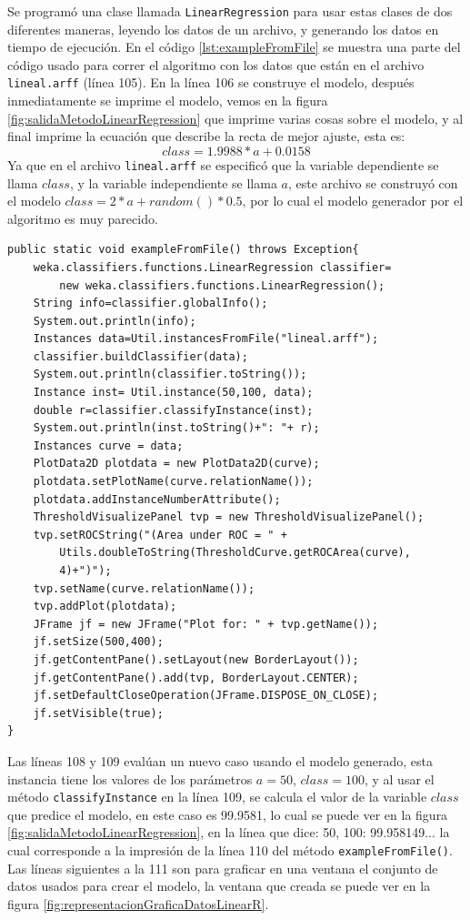 Se programó una clase llamada \texttt{LinearRegression} para usar estas clases de dos diferentes maneras, leyendo los datos de un archivo, y generando los datos en tiempo de ejecución. 
En el código \ref{lst:exampleFromFile} se muestra una parte del código usado para correr el algoritmo con los datos que están en el archivo \texttt{lineal.arff} (línea 105).
En la línea 106 se construye el modelo, después inmediatamente se imprime el modelo, vemos en la figura \ref{fig:salidaMetodoLinearRegression} que imprime varias cosas sobre el modelo, y al final imprime la ecuación que describe la recta de mejor ajuste, esta es:
$$class = 1.9988 * a + 0.0158$$
Ya que en el archivo \texttt{lineal.arff} se especificó que la variable dependiente se llama $class$, y la variable independiente se llama $a$, este archivo se construyó con el modelo $class = 2*a + random()*0.5$, por lo cual el modelo generador por el algoritmo es muy parecido.


\begin{lstlisting}[frame=single]  
public static void exampleFromFile() throws Exception{
	weka.classifiers.functions.LinearRegression classifier= 
		new weka.classifiers.functions.LinearRegression();
	String info=classifier.globalInfo();
	System.out.println(info);
	Instances data=Util.instancesFromFile("lineal.arff");	
	classifier.buildClassifier(data);
	System.out.println(classifier.toString());
	Instance inst= Util.instance(50,100, data);		
	double r=classifier.classifyInstance(inst);
	System.out.println(inst.toString()+": "+ r);		
	Instances curve = data;
	PlotData2D plotdata = new PlotData2D(curve);
	plotdata.setPlotName(curve.relationName());
	plotdata.addInstanceNumberAttribute();
	ThresholdVisualizePanel tvp = new ThresholdVisualizePanel();
	tvp.setROCString("(Area under ROC = " +
		Utils.doubleToString(ThresholdCurve.getROCArea(curve),
		4)+")");
	tvp.setName(curve.relationName());
	tvp.addPlot(plotdata);	
	JFrame jf = new JFrame("Plot for: " + tvp.getName());
	jf.setSize(500,400);
	jf.getContentPane().setLayout(new BorderLayout());
	jf.getContentPane().add(tvp, BorderLayout.CENTER);
	jf.setDefaultCloseOperation(JFrame.DISPOSE_ON_CLOSE);
	jf.setVisible(true);
}
\end{lstlisting}
Las líneas 108 y 109 evalúan un nuevo caso usando el modelo generado, esta instancia tiene los valores de los parámetros $a=50$, $class=100$, y al usar el método \texttt{classifyInstance} en la línea 109, se calcula el valor de la variable $class$ que predice el modelo, en este caso es 99.9581, lo cual se puede ver en la figura \ref{fig:salidaMetodoLinearRegression}, en la línea que dice: 50, 100: 99.958149... la cual corresponde a la impresión de la línea 110 del método \texttt{exampleFromFile()}.
Las líneas siguientes a la 111 son para graficar en una ventana el conjunto de datos usados para crear el modelo, la ventana que creada se puede ver en la figura \ref{fig:representacionGraficaDatosLinearR}.

